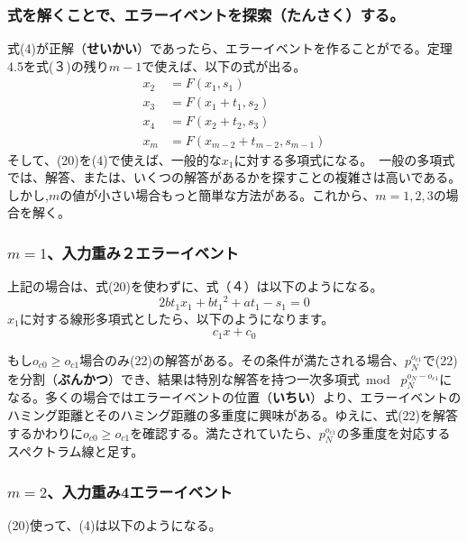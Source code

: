 \documentclass[24 pts]{article}
\begin{document}
\subsubsection{式を解くことで、エラーイベントを探索（\textbf{たんさく}）する。}
式(4)が正解（\textbf{せいかい}）であったら、エラーイベントを作ることがでる。定理4.5を式(３)の残り$m-1$で使えば、以下の式が出る。
\begin{align*}
x_2&=F(x_1, s_1 )\\
x_3&=F(x_1 +t_1,s_2 )\\
x_4&=F(x_2 +t_2,s_3 )\\
x_m&=F(x_{m-2} +t_{m-2},s_{m-1} )	\tag{20}
\end{align*}
そして、(20)を(4)で使えば、一般的な$x_1$に対する多項式になる。　一般の多項式では、解答、または、いくつの解答があるかを探すことの複雑さは高いである。しかし,$m$の値が小さい場合もっと簡単な方法がある。これから、$m=1,2,3$の場合を解く。
\newpage
\subsubsection{$m=1$、入力重み２エラーイベント}
上記の場合は、式(20)を使わずに、式（４）は以下のようになる。
\begin{equation}\tag{21}
2bt_1 x_1+b{t_1}^2+at_1-s_1=0	
\end{equation}				
$x_1$に対する線形多項式としたら、以下のようになります。
\begin{equation}\tag{22}
c_1 x+c_0
\end{equation}
						
もし$o_{c0}  \geq o_{c1}$場合のみ(22)の解答がある。その条件が満たされる場合、$p_N^{o_{c1}}$で(22)を分割（\textbf{ぶんかつ}）でき、結果は特別な解答を持つ一次多項式\ mod \ $p_N^{o_N-o_{c1}}$になる。多くの場合ではエラーイベントの位置（\textbf{いちい}）より、エラーイベントのハミング距離とそのハミング距離の多重度に興味がある。ゆえに、式(22)を解答するかわりに$o_{c0} \geq o_{c1}$を確認する。満たされていたら、$p_N^{o_{c1}}$の多重度を対応するスペクトラム線と足す。

\subsubsection{$m=2$、入力重み4エラーイベント}
(20)使って、(4)は以下のようになる。
\end{document}
